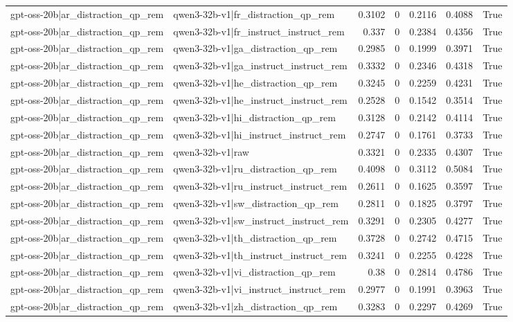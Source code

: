 \begin{table}
\begin{tabular}{l l r r r r l}
gpt-oss-20b|ar_distraction_qp_rem & qwen3-32b-v1|fr_distraction_qp_rem & 0.3102 & 0 & 0.2116 & 0.4088 & True \\
gpt-oss-20b|ar_distraction_qp_rem & qwen3-32b-v1|fr_instruct_instruct_rem & 0.337 & 0 & 0.2384 & 0.4356 & True \\
gpt-oss-20b|ar_distraction_qp_rem & qwen3-32b-v1|ga_distraction_qp_rem & 0.2985 & 0 & 0.1999 & 0.3971 & True \\
gpt-oss-20b|ar_distraction_qp_rem & qwen3-32b-v1|ga_instruct_instruct_rem & 0.3332 & 0 & 0.2346 & 0.4318 & True \\
gpt-oss-20b|ar_distraction_qp_rem & qwen3-32b-v1|he_distraction_qp_rem & 0.3245 & 0 & 0.2259 & 0.4231 & True \\
gpt-oss-20b|ar_distraction_qp_rem & qwen3-32b-v1|he_instruct_instruct_rem & 0.2528 & 0 & 0.1542 & 0.3514 & True \\
gpt-oss-20b|ar_distraction_qp_rem & qwen3-32b-v1|hi_distraction_qp_rem & 0.3128 & 0 & 0.2142 & 0.4114 & True \\
gpt-oss-20b|ar_distraction_qp_rem & qwen3-32b-v1|hi_instruct_instruct_rem & 0.2747 & 0 & 0.1761 & 0.3733 & True \\
gpt-oss-20b|ar_distraction_qp_rem & qwen3-32b-v1|raw & 0.3321 & 0 & 0.2335 & 0.4307 & True \\
gpt-oss-20b|ar_distraction_qp_rem & qwen3-32b-v1|ru_distraction_qp_rem & 0.4098 & 0 & 0.3112 & 0.5084 & True \\
gpt-oss-20b|ar_distraction_qp_rem & qwen3-32b-v1|ru_instruct_instruct_rem & 0.2611 & 0 & 0.1625 & 0.3597 & True \\
gpt-oss-20b|ar_distraction_qp_rem & qwen3-32b-v1|sw_distraction_qp_rem & 0.2811 & 0 & 0.1825 & 0.3797 & True \\
gpt-oss-20b|ar_distraction_qp_rem & qwen3-32b-v1|sw_instruct_instruct_rem & 0.3291 & 0 & 0.2305 & 0.4277 & True \\
gpt-oss-20b|ar_distraction_qp_rem & qwen3-32b-v1|th_distraction_qp_rem & 0.3728 & 0 & 0.2742 & 0.4715 & True \\
gpt-oss-20b|ar_distraction_qp_rem & qwen3-32b-v1|th_instruct_instruct_rem & 0.3241 & 0 & 0.2255 & 0.4228 & True \\
gpt-oss-20b|ar_distraction_qp_rem & qwen3-32b-v1|vi_distraction_qp_rem & 0.38 & 0 & 0.2814 & 0.4786 & True \\
gpt-oss-20b|ar_distraction_qp_rem & qwen3-32b-v1|vi_instruct_instruct_rem & 0.2977 & 0 & 0.1991 & 0.3963 & True \\
gpt-oss-20b|ar_distraction_qp_rem & qwen3-32b-v1|zh_distraction_qp_rem & 0.3283 & 0 & 0.2297 & 0.4269 & True \\

\end{tabular}
\end{table}
